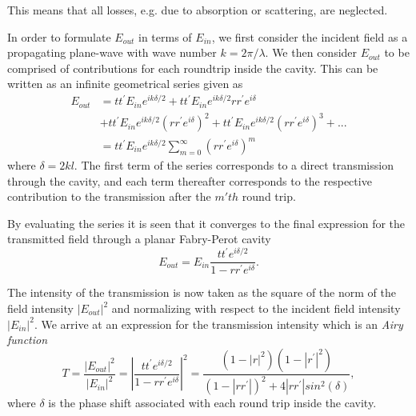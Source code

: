 This means that all losses, e.g. due to absorption or scattering, are neglected. 

In order to formulate $E_{out}$ in terms of $E_{in}$, we first consider the incident field as a propagating plane-wave with wave number $k = 2 \pi / \lambda$. We then consider $E_{out}$ to be comprised of contributions for each roundtrip inside the cavity. This can be written as an infinite geometrical series given as
\begin{equation}
    \begin{split}
        E_{out} & = tt^{\prime} E_{in} e^{ik \delta / 2} + tt^{\prime} E_{in} e^{ik \delta / 2} rr^{\prime} e^{i\delta}\\&+ tt^{\prime} E_{in} e^{ik \delta / 2} \left(rr^{\prime} e^{i\delta}\right)^2 + tt^{\prime} E_{in} e^{ik \delta / 2} \left(rr^{\prime} e^{i\delta}\right)^3 + ...\\& = tt^{\prime} E_{in} e^{ik \delta / 2} \sum^{\infty}_{m=0}\left( rr^{\prime}e^{i\delta} \right)^m
    \end{split}
    \label{eq:transmission_as_geometric_series}
\end{equation}
where $\delta = 2kl$. The first term of the series corresponds to a direct transmission through the cavity, and each term thereafter corresponds to the respective contribution to the transmission after the $m'th$ round trip. 

By evaluating the series it is seen that it converges to the final expression for the transmitted field through a planar Fabry-Perot cavity
\begin{equation}
    E_{out} = E_{in}\frac{tt^{\prime} e^{i\delta /2}}{1 - rr^{\prime} e^{i\delta}}.
    \label{eq:fabry_perot_trans}
\end{equation}

The intensity of the transmission is now taken as the square of the norm of the field intensity $|E_{out}|^2$ and normalizing with respect to the incident field intensity $|E_{in}|^2$. We arrive at an expression for the transmission intensity which is an \emph{Airy function}\cite{Pedrotti}
\begin{equation}
    T = \frac{|E_{out}|^2}{|E_{in}|^2} = \left|\frac{tt^{\prime}e^{i\delta/2}}{1 - rr^{\prime}e^{i \delta}}\right|^2 = \frac{(1-|r|^2)(1-|r^{\prime}|^2)}{(1-|rr^{\prime}|)^2 + 4|rr^{\prime}|sin^2(\delta)},
    \label{eq:airy_function}
\end{equation}
where $\delta$ is the phase shift associated with each round trip inside the cavity.

